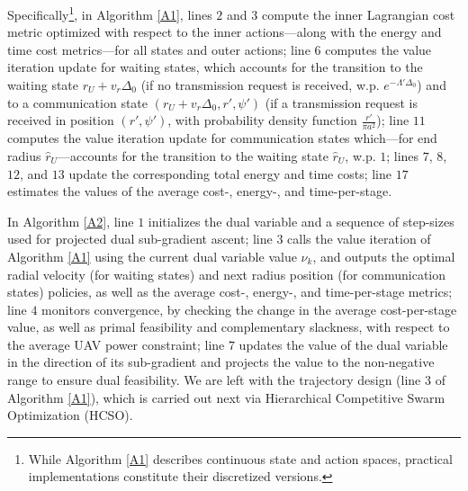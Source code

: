 \documentclass[10pt, twocolumn]{IEEEtran}
\theoremstyle{plain}
\theoremstyle{definition}
\theoremstyle{remark}
\begin{document}
Specifically\footnote{While Algorithm \ref{A1} describes continuous state and action spaces, practical implementations constitute their discretized versions.}, in Algorithm \ref{A1}, lines $2$ and $3$ compute the inner Lagrangian cost metric optimized with respect to the inner actions---along with the energy and time cost metrics---for all states and outer actions; line $6$ computes the value iteration update for waiting states, which accounts for the transition to the waiting state $r_{U}{+}v_{r}\Delta_{0}$ (if no transmission request is received, w.p. $e^{-\Lambda'\Delta_{0}}$) and to a communication state $(r_{U}{+}v_{r}\Delta_{0},r',\psi')$ (if a transmission request is received in position $(r',\psi')$, with probability density function $\frac{r'}{\pi a^{2}}$); line $11$ computes the value iteration update for communication states which---for end radius $\hat{r}_{U}$---accounts for the transition to the waiting state $\hat{r}_{U}$, w.p. $1$; lines $7$, $8$, $12$, and $13$ update the corresponding total energy and time costs; line $17$ estimates the values of the average cost-, energy-, and time-per-stage.

In Algorithm \ref{A2}, line $1$ initializes the dual variable and a sequence of step-sizes used for projected dual sub-gradient ascent; line $3$ calls the value iteration of Algorithm \ref{A1} using the current dual variable value $\nu_{k}$, and outputs the optimal radial velocity (for waiting states) and next radius position (for communication states) policies, as well as the average cost-, energy-, and time-per-stage metrics; line $4$ monitors convergence, by checking the change in the average cost-per-stage value, as well as primal feasibility and complementary slackness, with respect to the average UAV power constraint; line $7$ updates the value of the dual variable in the direction of its sub-gradient and projects the value to the non-negative range to ensure dual feasibility. We are left with the trajectory design (line $3$ of Algorithm \ref{A1}), which is carried out next via Hierarchical Competitive Swarm Optimization (HCSO).
\vspace{-4mm}
\end{document}

